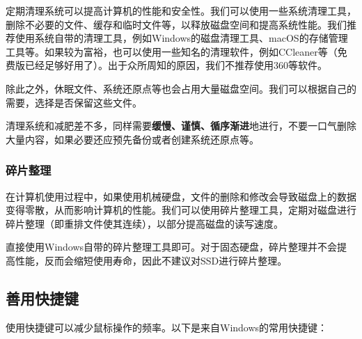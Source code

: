 \documentclass[../main.tex]{subfiles}
\begin{document}
定期清理系统可以提高计算机的性能和安全性。我们可以使用一些系统清理工具，删除不必要的文件、缓存和临时文件等，以释放磁盘空间和提高系统性能。我们推荐使用系统自带的清理工具，例如Windows的磁盘清理工具、macOS的存储管理工具等。如果较为富裕，也可以使用一些知名的清理软件，例如CCleaner等（免费版已经足够好用了）。出于众所周知的原因，我们不推荐使用360等软件。

除此之外，休眠文件、系统还原点等也会占用大量磁盘空间。我们可以根据自己的需要，选择是否保留这些文件。

\begin{caution}
  清理系统和减肥差不多，同样需要\textbf{缓慢、谨慎、循序渐进}地进行，不要一口气删除大量内容，如果必要还应预先备份或者创建系统还原点等。
\end{caution}

\subsubsection{碎片整理}

在计算机使用过程中，如果使用机械硬盘，文件的删除和修改会导致磁盘上的数据变得零散，从而影响计算机的性能。我们可以使用碎片整理工具，定期对磁盘进行碎片整理（即重排文件使其连续），以部分提高磁盘的读写速度。

直接使用Windows自带的碎片整理工具即可。对于固态硬盘，碎片整理并不会提高性能，反而会缩短使用寿命，因此不建议对SSD进行碎片整理。

\subsection{善用快捷键}

使用快捷键可以减少鼠标操作的频率。以下是来自Windows的常用快捷键：
\end{document}
